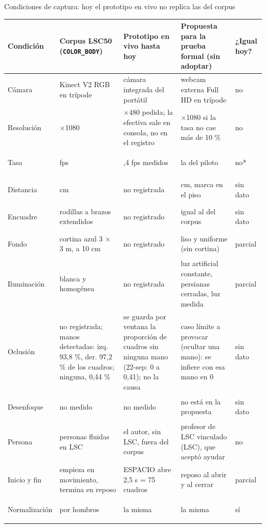\documentclass[aspectratio=169,10pt,xcolor={table}]{beamer}
\begin{document}
\begin{frame}{Condiciones de captura: hoy el prototipo en vivo no replica las del corpus}\label{fr:condiciones}
\fontsize{6.4}{7.5}\selectfont
\renewcommand{\arraystretch}{1.08}
\begin{tabularx}{\textwidth}{@{}>{\bfseries\raggedright\arraybackslash}p{1.45cm} >{\raggedright\arraybackslash\leavevmode}X >{\raggedright\arraybackslash\leavevmode}X >{\raggedright\arraybackslash\leavevmode}X >{\centering\arraybackslash}p{0.95cm}@{}}
\toprule
Condición & Corpus LSC50 (\texttt{COLOR\_BODY}) & Prototipo en vivo hasta hoy & \textbf{Propuesta} para la prueba formal (sin adoptar) & ¿Igual hoy? \\
\midrule
Cámara & Kinect V2 RGB en trípode & cámara integrada del portátil & webcam externa Full HD en trípode & no \\
Resolución & 1920$\times$1080 & 640$\times$480 pedida; la efectiva sale en consola, no en el registro & 1920$\times$1080 si la tasa no cae más de 10 \% & no \\
Tasa & 24 fps & 30,4 fps medidos & la del piloto & no* \\
Distancia & 200 cm & no registrada & 200 cm, marca en el piso & sin dato \\
Encuadre & rodillas a brazos extendidos & no registrado & igual al del corpus & sin dato \\
Fondo & cortina azul 3 $\times$ 3 m, a 10 cm & no registrado & liso y uniforme (sin cortina) & parcial \\
Iluminación & blanca y homogénea & no registrada & luz artificial constante, persianas cerradas, luz medida & parcial \\
Oclusión & no registrada; manos detectadas: izq. 93,8 \%, der. 97,2 \% de los cuadros; ninguna, 0,44 \% & se guarda por ventana la proporción de cuadros sin ninguna mano (22-sep: 0 a 0,41); no la causa & caso límite a provocar (ocultar una mano): se infiere con esa mano en 0 & sin dato \\
Desenfoque & no medido & no medido & no está en la propuesta & sin dato \\
Persona & 5 personas fluidas en LSC & el autor, sin LSC, fuera del corpus & profesor de LSC vinculado (LSC), que aceptó ayudar & no \\
Inicio y fin & empieza en movimiento, termina en reposo & ESPACIO abre 2,5 s = 75 cuadros & reposo al abrir y al cerrar & parcial \\
Normalización & por hombros & la misma & la misma & sí \\
\bottomrule
\end{tabularx}


\end{frame}
\end{document}
